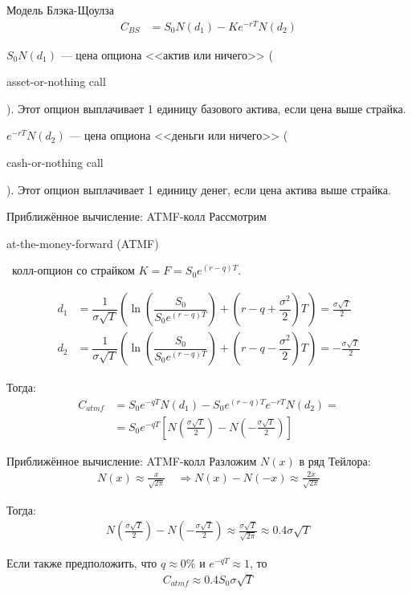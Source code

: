 \documentclass{beamer}
\newcommand{\en}[1]{\begin{otherlanguage}{english}#1\end{otherlanguage}}
\begin{document}
\begin{frame}{Модель Блэка-Щоулза}
\begin{align*}
C_{BS} &= S_0N(d_1) - Ke^{-rT}N(d_2)
\end{align*}

\justify
$S_0N(d_1)$ --- цена опциона <<актив или ничего>> (\en{asset-or-nothing call}). Этот опцион выплачивает 1 единицу базового актива, если цена выше страйка.

\justify
$e^{-rT}N(d_2)$ --- цена опциона <<деньги или ничего>> (\en{cash-or-nothing call}). Этот опцион выплачивает 1 единицу денег, если цена актива выше страйка.
\end{frame}



\begin{frame}{Приближённое вычисление: ATMF-колл}
\justify
Рассмотрим \en{at-the-money-forward (ATMF)}\ колл-опцион со страйком $K = F = S_0e^{(r-q)T}$.

\begin{align*}
d_1 &= \dfrac{1}{\sigma\sqrt{T}}\left( \ln\left(\dfrac{S_0}{S_0e^{(r-q)T}}\right) + \left(r -q + \dfrac{\sigma^2}{2}\right)T\right) = \frac{\sigma \sqrt{T}}{2} \\
d_2 &= \dfrac{1}{\sigma\sqrt{T}}\left( \ln\left(\dfrac{S_0}{S_0e^{(r-q)T}}\right) + \left(r -q- \dfrac{\sigma^2}{2}\right)T\right) = -\frac{\sigma \sqrt{T}}{2}
\end{align*}

Тогда:
\begin{align*}
C_{atmf} &= S_0e^{-qT}N(d_1) - S_0e^{(r-q)T}e^{-rT}N(d_2) = \\
&= S_0e^{-qT}\left[
N\left(\frac{\sigma \sqrt{T}}{2}\right) - N\left(-\frac{\sigma \sqrt{T}}{2}\right)
\right]
\end{align*}
\end{frame}



\begin{frame}{Приближённое вычисление: ATMF-колл}
\justify
Разложим $N(x)$ в ряд Тейлора:
\begin{align*}
N(x) \approx \frac{x}{\sqrt{2\pi}} \quad \Rightarrow
N(x) - N(-x) \approx \frac{2x}{\sqrt{2\pi}}
\end{align*}

Тогда:
\begin{align*}
N\left(\frac{\sigma \sqrt{T}}{2}\right) - N\left(-\frac{\sigma \sqrt{T}}{2}\right)
\approx
\frac{\sigma\sqrt{T}}{\sqrt{2\pi}}
\approx
0.4\sigma\sqrt{T}
\end{align*}

Если также предположить, что $q\approx 0\%$ и $e^{-qT} \approx 1$, то
\begin{align*}
C_{atmf} \approx 0.4 S_0 \sigma \sqrt{T}
\end{align*}
\end{frame}
\end{document}
